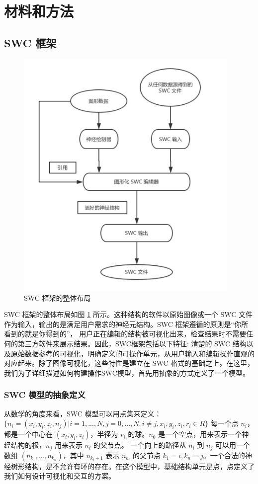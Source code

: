 {\section{材料和方法}

\subsection{SWC 框架}

\begin{figure}
\centering
\includegraphics[width=108mm]{images/t1}
\caption{SWC 框架的整体布局}
\label{fan1}
\end{figure}

SWC 框架的整体布局如图 \ref{fan1} 所示。这种结构的软件以原始图像或一个 SWC 文件作为输入，输出的是满足用户需求的神经元结构。SWC 框架遵循的原则是“你所看到的就是你得到的”， 用户正在编辑的结构被可视化出来，检查结果时不需要任何的第三方软件来展示结果。因此，SWC框架包括以下特征: 清楚的 SWC 结构以及原始数据参考的可视化，明确定义的可操作单元，从用户输入和编辑操作直观的对应起来。除了图像可视化，这些特性是建立在 SWC 格式的基础之上。在这里，我们为了详细描述如何构建操作SWC模型，首先用抽象的方式定义了一个模型。

\subsubsection{SWC 模型的抽象定义}

从数学的角度来看，SWC 模型可以用点集来定义：$\{ n_i = (x_i, y_i, z_i, n_j) | i = 1,..., N, j = 0,..., N, i \neq j, x_i, y_i, z_i, r_i \in R \}$ 每一个点 $n_i$， 都是一个中心在 $(x_i, y_i, z_i)$，半径为 $r_i$ 的球。$n_0$ 是一个空点，用来表示一个神经结构的根，$n_j$ 用来表示 $n_i$ 的父节点。 一个向上的路径从 $n_i$ 到 $n_j$ 可以用一个数组 $(n_{k_1},...,n_{k_n})$，其中 $n_{k_i+1}$ 表示 $n_{k_i}$ 的父节点 $k_1 = i, k_n = j$。一个合法的神经树形结构，是不允许有环的存在。在这个模型中，基础结构单元是点，点定义了我们如何设计可视化和交互的方案。

}
